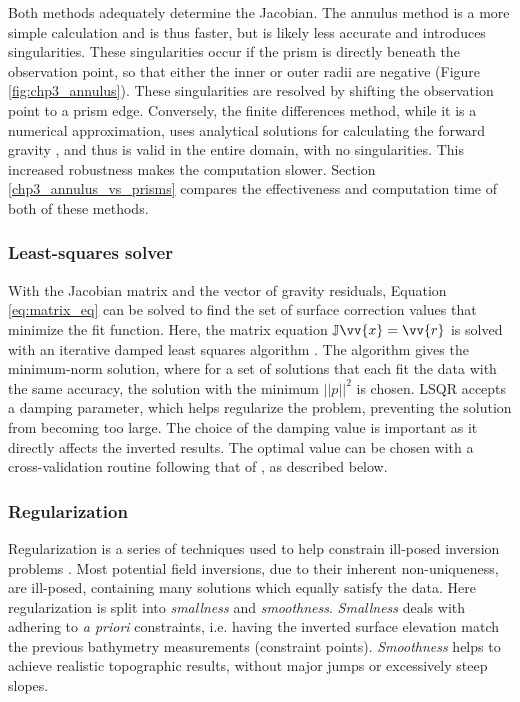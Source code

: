 Both methods adequately determine the Jacobian. The annulus method is a more simple calculation and is thus faster, but is likely less accurate and introduces singularities. These singularities occur if the prism is directly beneath the observation point, so that either the inner or outer radii are negative (Figure \ref{fig:chp3_annulus}). These singularities are resolved by shifting the observation point to a prism edge. Conversely, the finite differences method, while it is a numerical approximation, uses analytical solutions for calculating the forward gravity \citep{nagygravitational2000, fatiandoaterraprojectharmonica2023}, and thus is valid in the entire domain, with no singularities. This increased robustness makes the computation slower. Section \ref{chp3_annulus_vs_prisms} compares the effectiveness and computation time of both of these methods.

\subsubsection{Least-squares solver}

With the Jacobian matrix and the vector of gravity residuals, Equation \ref{eq:matrix_eq} can be solved to find the set of surface correction values that minimize the fit function. Here, the matrix equation $\mathbb{J} \vv{x} = \vv{r}$ is solved with an iterative damped least squares algorithm \citep[LSQR][]{paigelsqr1982}. The algorithm gives the minimum-norm solution, where for a set of solutions that each fit the data with the same accuracy, the solution with the minimum $||p||^2$ is chosen. LSQR accepts a damping parameter, which helps regularize the problem, preventing the solution from becoming too large. The choice of the damping value is important as it directly affects the inverted results. The optimal value can be chosen with a cross-validation routine following that of \citet{uiedafast2017}, as described below.

\subsubsection{Regularization} \label{chp3:regularization}

Regularization is a series of techniques used to help constrain ill-posed inversion problems \citep{asterparameter2018}. Most potential field inversions, due to their inherent non-uniqueness, are ill-posed, containing many solutions which equally satisfy the data. Here regularization is split into \textit{smallness} and \textit{smoothness}. \textit{Smallness} deals with adhering to \textit{a priori} constraints, i.e. having the inverted surface elevation match the previous bathymetry measurements (constraint points). \textit{Smoothness} helps to achieve realistic topographic results, without major jumps or excessively steep slopes. 

